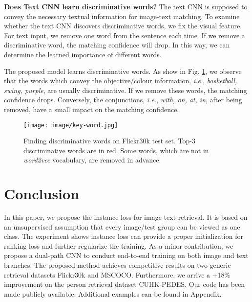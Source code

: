 \documentclass[10pt,final,journal]{IEEEtran}
\newcommand{\ie}{\mbox{\emph{i.e.}}}
\begin{document}
\textbf{Does Text CNN learn discriminative words?} \label{word}
The text CNN is supposed to convey the necessary textual information for image-text matching. To examine whether the text CNN discovers discriminative words, we fix the visual feature. For text input, we remove one word from the sentence each time. If we remove a discriminative word, the matching confidence will drop. In this way, we can determine the learned importance of different words. 

The proposed model learns discriminative words. As show in Fig. \ref{fig:key-word}, we observe that the words which convey the objective/colour information, \ie, \emph{basketball, swing, purple}, are usually discriminative. If we remove these words, the matching confidence drops. Conversely, the conjunctions, \ie, \emph{with, on, at, in}, after being removed, have a small impact on the matching confidence. 

\begin{figure}[t]
\begin{center}
\texttt{[image: image/key-word.jpg]}
\end{center}
\vspace{-.1in}
   \caption{Finding discriminative words on Flickr30k test set. Top-3 discriminative words are in red. Some words, which are not in \emph{word2vec} vocabulary, are removed in advance.}
\label{fig:key-word}
\end{figure}  

\section{Conclusion} \label{sec:conclusion}
In this paper, we propose the instance loss for image-text retrieval. It is based on an unsupervised assumption that every image/test group can be viewed as one class. The experiment shows instance loss can provide a proper initialization for ranking loss and further regularize the training. 
As a minor contribution, we propose a dual-path CNN to conduct end-to-end training on both image and text branches. The proposed method achieves competitive results on two generic retrieval datasets Flickr30k and MSCOCO. Furthermore, we arrive a +18\% improvement on the person retrieval dataset CUHK-PEDES. Our code has been made publicly available.
Additional examples can be found in Appendix.






{
\footnotesize


}
\end{document}
